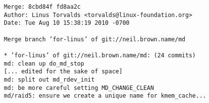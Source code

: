 \documentclass{article}
\begin{document}
\begin{verbatim}
Merge: 8cbd84f fd8aa2c
Author: Linus Torvalds <torvalds@linux-foundation.org>
Date: Tue Aug 10 15:38:19 2010 -0700

Merge branch ’for-linus’ of git://neil.brown.name/md

* ’for-linus’ of git://neil.brown.name/md: (24 commits)
md: clean up do_md_stop
[... edited for the sake of space]
md: split out md_rdev_init
md: be more careful setting MD_CHANGE_CLEAN
md/raid5: ensure we create a unique name for kmem_cache...
\end{verbatim}
\end{document}
